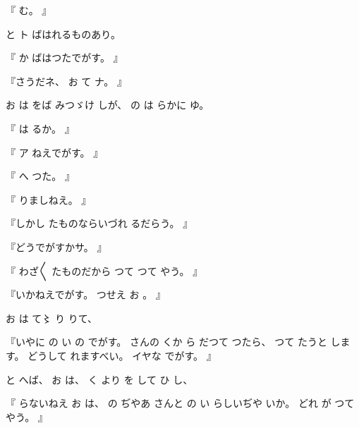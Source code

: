 %
『
む。
』

%
と
ト
ばはれるものあり。

%
『
か
ばはつたでがす。
』

%
『さうだネ、
%
お
て
ナ。
』

%
お
は
をば
みつゞけ
しが、
%
の
は
らかに
ゆ。

%
『
は
るか。
』

%
『
ア
ねえでがす。
』

%
『
へ
つた。
』

%
『
りましねえ。
』

%
『しかし
たものならいづれ
るだらう。
』

%
『どうでがすかサ。
』

%
『
わざ〳〵
たものだから
つて
つて
やう。
』

%
『いかねえでがす。
%
つせえ
お
。
』

%
お
は
て〻
り
りて、

%
『いやに
の
い
の
でがす。
%
さんの
くか
ら
だつて
つたら、
%
つて
たうと
します。
%
どうして
れますべい。
%
イヤな
でがす。
』

%
と
へば、
%
お
は、
%
く
より
を
して
ひ
し、

%
『
らないねえ
お
は、
%
の
ぢやあ
さんと
の
い
らしいぢや
いか。
%
どれ
が
つて
やう。
』

